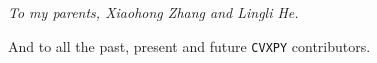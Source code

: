 
\begin{flushright}
  \itshape
  To my parents, Xiaohong Zhang and Lingli He.

  And to all the past, present and future \texttt{CVXPY} contributors.
\end{flushright}
